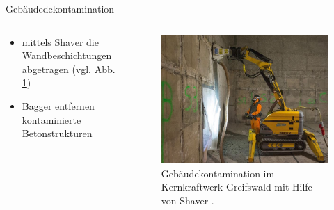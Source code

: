 \begin{frame}{Gebäudedekontamination}
  \begin{columns}

    \begin{column}{0.48\textwidth}
      \begin{itemize}
        \setlength\itemsep{1.2em}
        \item{ mittels Shaver die Wandbeschichtungen abgetragen (vgl. Abb. \ref{fig: gebaeudekontamination})}
        \item {Bagger entfernen kontaminierte Betonstrukturen }
      \end{itemize}
    \end{column}

    \begin{column}{0.48\textwidth}
      \begin{figure}
         \centering
         \includegraphics[width=1\textwidth]{./bilder/gebaeudedekontamination.png}
         \caption{Gebäudekontamination im Kernkraftwerk Greifswald mit Hilfe von Shaver \cite{gebauededekontamination}. }
         \label{fig: gebaeudekontamination}
       \end{figure}
    \end{column}

  \end{columns}
\end{frame}


